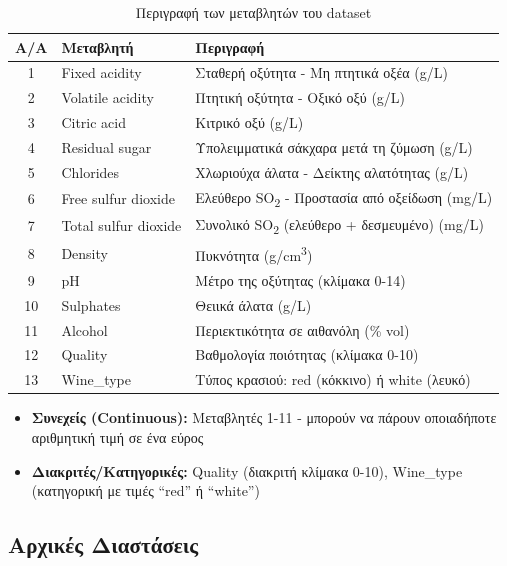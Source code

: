 \documentclass[12pt,a4paper]{article}
\begin{document}
\begin{table}[H]
\centering
\caption{Περιγραφή των μεταβλητών του dataset}
\label{tab:variables}
\begin{tabular}{@{}clp{8cm}@{}}
\toprule
\textbf{Α/Α} & \textbf{Μεταβλητή} & \textbf{Περιγραφή} \\
\midrule
1 & Fixed acidity & Σταθερή οξύτητα - Μη πτητικά οξέα (g/L) \\
2 & Volatile acidity & Πτητική οξύτητα - Οξικό οξύ (g/L) \\
3 & Citric acid & Κιτρικό οξύ (g/L) \\
4 & Residual sugar & Υπολειμματικά σάκχαρα μετά τη ζύμωση (g/L) \\
5 & Chlorides & Χλωριούχα άλατα - Δείκτης αλατότητας (g/L) \\
6 & Free sulfur dioxide & Ελεύθερο SO\textsubscript{2} - Προστασία από οξείδωση (mg/L) \\
7 & Total sulfur dioxide & Συνολικό SO\textsubscript{2} (ελεύθερο + δεσμευμένο) (mg/L) \\
8 & Density & Πυκνότητα (g/cm\textsuperscript{3}) \\
9 & pH & Μέτρο της οξύτητας (κλίμακα 0-14) \\
10 & Sulphates & Θειικά άλατα (g/L) \\
11 & Alcohol & Περιεκτικότητα σε αιθανόλη (\% vol) \\
12 & Quality & Βαθμολογία ποιότητας (κλίμακα 0-10) \\
13 & Wine\_type & Τύπος κρασιού: red (κόκκινο) ή white (λευκό) \\
\bottomrule
\end{tabular}
\end{table}

\begin{infobox}
\begin{itemize}
    \item \textbf{Συνεχείς (Continuous):} Μεταβλητές 1-11 - μπορούν να πάρουν οποιαδήποτε αριθμητική τιμή σε ένα εύρος
    \item \textbf{Διακριτές/Κατηγορικές:} Quality (διακριτή κλίμακα 0-10), Wine\_type (κατηγορική με τιμές ``red'' ή ``white'')
\end{itemize}
\end{infobox}

\subsection{Αρχικές Διαστάσεις}
\end{document}

